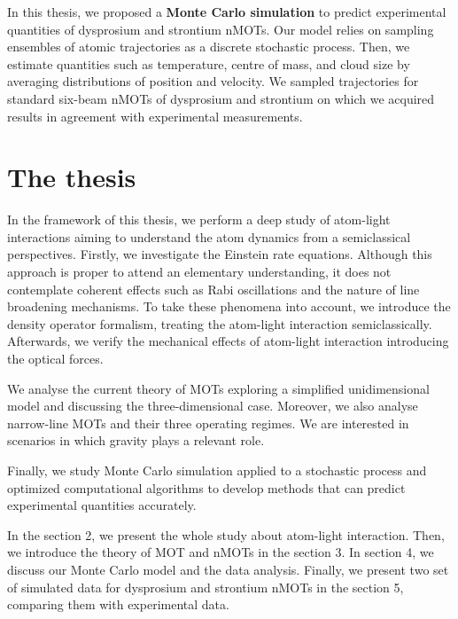 In this thesis, we proposed a \textbf{Monte Carlo simulation} to predict experimental quantities of dysprosium and strontium nMOTs. Our model relies on sampling ensembles of atomic trajectories as a discrete stochastic process. Then, we estimate quantities such as temperature, centre of mass, and cloud size by averaging distributions of position and velocity. We sampled trajectories for standard six-beam nMOTs of dysprosium and strontium on which we acquired results in agreement with experimental measurements.

\section{The thesis}
\label{sec:introduction-thesis}

In the framework of this thesis, we perform a deep study of atom-light interactions aiming to understand the atom dynamics from a semiclassical perspectives. Firstly, we investigate the Einstein rate equations. Although this approach is proper to attend an elementary understanding, it does not contemplate coherent effects such as Rabi oscillations and the nature of line broadening mechanisms. To take these phenomena into account, we introduce the density operator formalism, treating the atom-light interaction semiclassically. Afterwards, we verify the mechanical effects of atom-light interaction introducing the optical forces.

We analyse the current theory of MOTs exploring a simplified unidimensional model and discussing the three-dimensional case. Moreover, we also analyse narrow-line MOTs and their three operating regimes. We are interested in scenarios in which gravity plays a relevant role.

Finally, we study Monte Carlo simulation applied to a stochastic process and optimized computational algorithms to develop methods that can predict experimental quantities accurately.

In the section 2, we present the whole study about atom-light interaction. Then, we introduce the theory of MOT and nMOTs in the section 3. In section 4, we discuss our Monte Carlo model and the data analysis. Finally, we present two set of simulated data for dysprosium and strontium nMOTs in the section 5, comparing them with experimental data.
